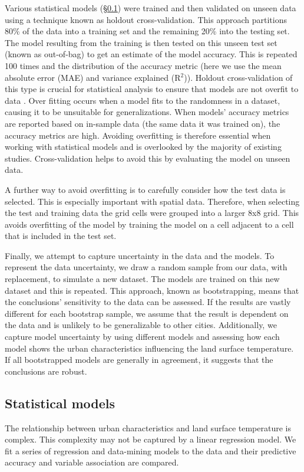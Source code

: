 \documentclass[review]{elsarticle}
\begin{document}
Various statistical models (\S \ref{ss:models}) were trained and then validated on unseen data using a technique known as holdout cross-validation. 
This approach partitions 80\% of the data into a training set and the remaining 20\% into the testing set.
The model resulting from the training is then tested on this unseen test set (known as out-of-bag) to get an estimate of the model accuracy.
This is repeated 100 times and the distribution of the accuracy metric (here we use the mean absolute error (MAE) and variance explained (R$^2$)).
Holdout cross-validation of this type is crucial for statistical analysis to ensure that models are not overfit to data \cite{Geron2017-ek}.
Over fitting occurs when a model fits to the randomness in a dataset, causing it to be unsuitable for generalizations. 
When models' accuracy metrics are reported based on in-sample data (the same data it was trained on), the accuracy metrics are high.
Avoiding overfitting is therefore essential when working with statistical models and is overlooked by the majority of existing studies.
Cross-validation helps to avoid this by evaluating the model on unseen data.

A further way to avoid overfitting is to carefully consider how the test data is selected.
This is especially important with spatial data.
Therefore, when selecting the test and training data the grid cells were grouped into a larger 8x8 grid.
This avoids overfitting of the model by training the model on a cell adjacent to a cell that is included in the test set.

Finally, we attempt to capture uncertainty in the data and the models. 
To represent the data uncertainty, we draw a random sample from our data, with replacement, to simulate a new dataset.
The models are trained on this new dataset and this is repeated.
This approach, known as bootstrapping, means that the conclusions' sensitivity to the data can be assessed.
If the results are vastly different for each bootstrap sample, we assume that the result is dependent on the data and is unlikely to be generalizable to other cities.
Additionally, we capture model uncertainty by using different models and assessing how each model shows the urban characteristics influencing the land surface temperature.
If all bootstrapped models are generally in agreement, it suggests that the conclusions are robust.


\subsection{Statistical models}
\label{ss:models}
The relationship between urban characteristics and land surface temperature is complex.
This complexity may not be captured by a linear regression model. 
We fit a series of regression and data-mining models to the data and their predictive accuracy and variable association are compared.
\end{document}
